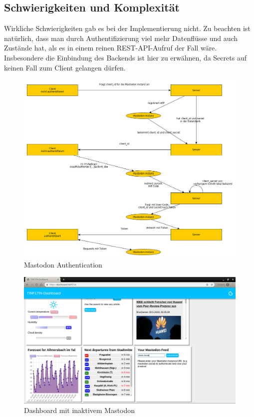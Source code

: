 \documentclass[fleqn,10pt]{SelfArx} %
\begin{document}
\subsection{Schwierigkeiten und Komplexität}
Wirkliche Schwierigkeiten gab es bei der Implementierung nicht. Zu beachten ist natürlich, dass man durch Authentifizierung viel mehr Datenflüsse und auch Zustände hat, als es in einem reinen REST-API-Aufruf der Fall wäre. Insbesondere die Einbindung des Backends ist hier zu erwähnen, da Secrets auf keinen Fall zum Client gelangen dürfen.
\begin{figure}
\includegraphics[width=\linewidth]{mastodon.jpg}
\caption{Mastodon Authentication}\label{fig:mastodon1}
\end{figure}
\begin{figure}
    \includegraphics[width=\linewidth]{images/1.png}
    \caption{Dashboard mit inaktivem Mastodon}\label{fig:demo1}
\end{figure}
\end{document}
